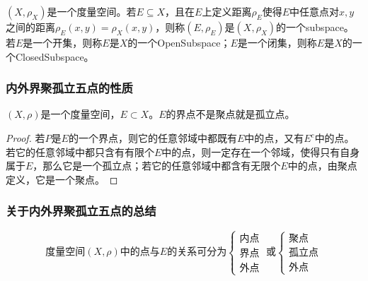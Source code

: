 \begin{definition}
	$(X,\rho_X)$是一个度量空间。若$E\subseteq X$，且在$E$上定义距离$\rho_E$使得$E$中任意点对$x,y$之间的距离$\rho_E(x,y)=\rho_X(x,y)$，则称$(E,\rho_E)$是$(X,\rho_X)$的一个\gls{subspace}。若$E$是一个开集，则称$E$是$X$的一个\gls{OpenSubspace}；$E$是一个闭集，则称$E$是$X$的一个\gls{ClosedSubspace}。
\end{definition}
\subsubsection{内外界聚孤立五点的性质}
\begin{theorem}
	$(X,\rho)$是一个度量空间，$E\subset X$。$E$的界点不是聚点就是孤立点。
\end{theorem}
\begin{proof}
	若$P$是$E$的一个界点，则它的任意邻域中都既有$E$中的点，又有$E^c$中的点。若它的任意邻域中都只含有有限个$E$中的点，则一定存在一个邻域，使得只有自身属于$E$，那么它是一个孤立点；若它的任意邻域中都含有无限个$E$中的点，由聚点定义，它是一个聚点。
\end{proof}
\subsubsection{关于内外界聚孤立五点的总结}
\begin{equation*}
	\text{度量空间}(X,\rho)\text{中的点与$E$的关系可分为}
	\begin{cases}
		\text{内点} \\
		\text{界点} \\
		\text{外点}    
	\end{cases}\;\text{或}
	\begin{cases}
		\text{聚点}   \\
		\text{孤立点} \\
		\text{外点}    
	\end{cases}
\end{equation*}
